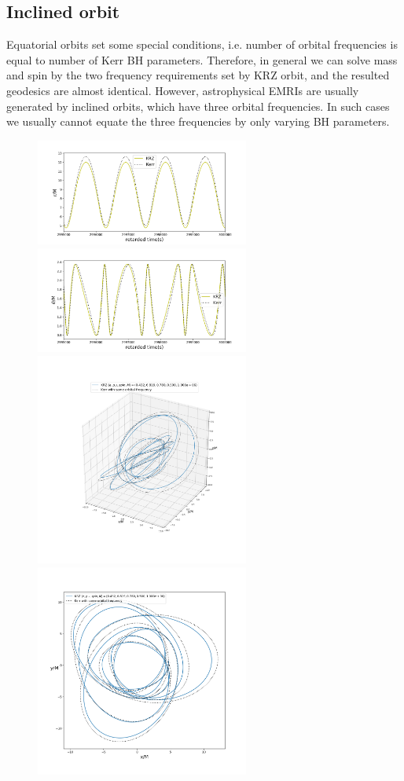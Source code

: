 \documentclass{article}
\begin{document}
\subsection{Inclined orbit}
\label{p_3d}
Equatorial orbits set some special conditions, i.e. number of orbital frequencies is equal to number of Kerr BH parameters. Therefore, in general we can solve mass and spin by the two frequency requirements set by KRZ orbit, and the resulted geodesics are almost identical. However, astrophysical EMRIs are usually generated by inclined orbits, which have three orbital frequencies. In such cases we usually cannot equate the three frequencies by only varying BH parameters. 

\begin{figure}[!htb]
	\centering
	\includegraphics[width=7cm]{r3d.png}
	\includegraphics[width=7cm]{th3d.png}
	\includegraphics[width=7cm]{trace3d.png}
	\includegraphics[width=7cm]{tracexy.png}

\end{figure}
\end{document}
